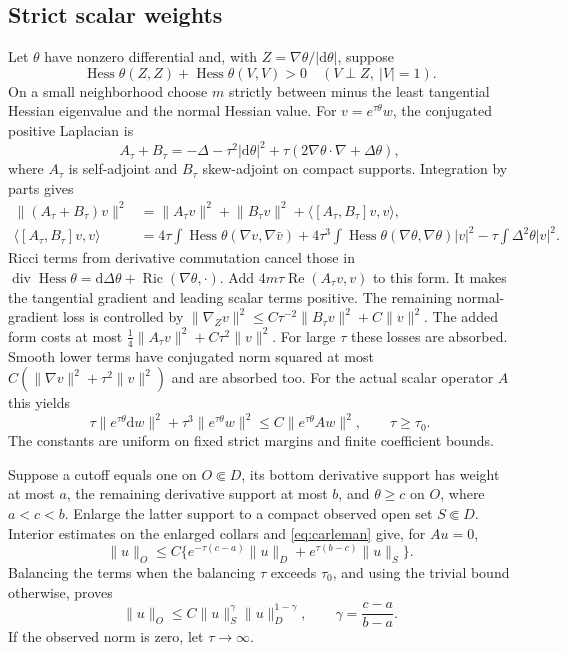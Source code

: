 \documentclass[11pt]{article}
\theoremstyle{definition}\newtheorem{definition}[theorem]{Definition}
\theoremstyle{remark}\newtheorem{remark}[theorem]{Remark}
\newcommand{\dd}{\mathrm d}
\newcommand{\Hess}{\operatorname{Hess}}
\newcommand{\Div}{\operatorname{div}}
\newcommand{\ip}[2]{\langle #1,#2\rangle}
\newcommand{\norm}[1]{\lVert #1\rVert}
\begin{document}
\subsection{Strict scalar weights}
Let $\theta$ have nonzero differential and, with $Z=\nabla\theta/|\dd\theta|$,
suppose
\begin{equation}\label{eq:strictscalar}
 \Hess\theta(Z,Z)+\Hess\theta(V,V)>0\quad(V\perp Z,\ |V|=1).
\end{equation}
On a small neighborhood choose $m$ strictly between minus the least
tangential Hessian eigenvalue and the normal Hessian value. For
$v=e^{\tau\theta}w$, the conjugated positive Laplacian is
\[
 A_\tau+B_\tau=-\Delta-\tau^2|\dd\theta|^2
       +\tau(2\nabla\theta\cdot\nabla+\Delta\theta),
\]
where $A_\tau$ is self-adjoint and $B_\tau$ skew-adjoint on compact supports.
Integration by parts gives
\begin{align*}
 \norm{(A_\tau+B_\tau)v}^2
 &=\norm{A_\tau v}^2+\norm{B_\tau v}^2+\ip{[A_\tau,B_\tau]v}{v},\\
 \ip{[A_\tau,B_\tau]v}{v}
 &=4\tau\int\Hess\theta(\nabla v,\nabla\bar v)
   +4\tau^3\int\Hess\theta(\nabla\theta,\nabla\theta)|v|^2
   -\tau\int\Delta^2\theta|v|^2.
\end{align*}
Ricci terms from derivative commutation cancel those in
$\Div\Hess\theta=\dd\Delta\theta+\operatorname{Ric}(\nabla\theta,\cdot)$.
Add $4m\tau\operatorname{Re}(A_\tau v,v)$ to this form. It makes the
tangential gradient and leading scalar terms positive. The remaining
normal-gradient loss is controlled by
$\norm{\nabla_Zv}^2\le C\tau^{-2}\norm{B_\tau v}^2+C\norm{v}^2$.
The added form costs at most $\frac14\norm{A_\tau v}^2+C\tau^2\norm{v}^2$.
For large $\tau$ these losses are absorbed. Smooth lower terms have
conjugated norm squared at most $C(\norm{\nabla v}^2+\tau^2\norm{v}^2)$
and are absorbed too. For the actual scalar operator $A$ this yields
\begin{equation}\label{eq:carleman}
 \tau\norm{e^{\tau\theta}\dd w}^2+\tau^3\norm{e^{\tau\theta}w}^2
 \le C\norm{e^{\tau\theta}Aw}^2,\qquad \tau\ge\tau_0.
\end{equation}
The constants are uniform on fixed strict margins and finite coefficient bounds.

Suppose a cutoff equals one on $O\Subset D$, its bottom derivative support
has weight at most $a$, the remaining derivative support at most $b$, and
$\theta\ge c$ on $O$, where $a<c<b$. Enlarge the latter support to a compact
observed open set $S\Subset D$. Interior estimates on the enlarged collars
and \eqref{eq:carleman} give, for $Au=0$,
\[
 \norm{u}_O\le C\{e^{-\tau(c-a)}\norm{u}_D+
                       e^{\tau(b-c)}\norm{u}_S\}.
\]
Balancing the terms when the balancing $\tau$ exceeds $\tau_0$, and using
the trivial bound otherwise, proves
\begin{equation}\label{eq:interp}
 \norm{u}_O\le C\norm{u}_S^\gamma\norm{u}_D^{1-\gamma},
 \qquad\gamma=\frac{c-a}{b-a}.
\end{equation}
If the observed norm is zero, let $\tau\to\infty$.
\end{document}
